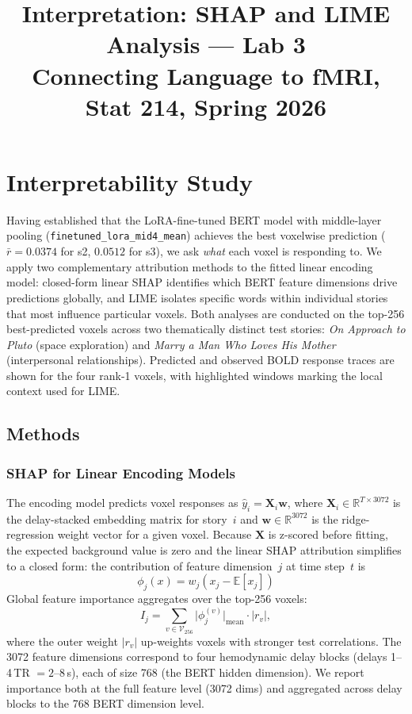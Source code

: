\documentclass[letterpaper,11pt]{article}
\title{Interpretation: SHAP and LIME Analysis --- Lab 3\\
       \large Connecting Language to fMRI, Stat 214, Spring 2026\vspace{-1em}}
\date{}
\begin{document}
\maketitle


\section{Interpretability Study}


Having established that the LoRA-fine-tuned BERT model with middle-layer pooling
(\texttt{finetuned\_lora\_mid4\_mean}) achieves the best voxelwise prediction
($\bar{r} = 0.0374$ for s2, $0.0512$ for s3), we ask \emph{what} each voxel is
responding to.  We apply two complementary attribution methods to the fitted
linear encoding model: closed-form linear SHAP identifies which BERT feature
dimensions drive predictions globally, and LIME isolates specific words within
individual stories that most influence particular voxels.  Both analyses are
conducted on the top-256 best-predicted voxels across two thematically distinct
test stories: \textit{On Approach to Pluto} (space exploration) and
\textit{Marry a Man Who Loves His Mother} (interpersonal relationships).
Predicted and observed BOLD response traces are shown for the four rank-1
voxels, with highlighted windows marking the local context used for LIME.


\subsection{Methods}


\subsubsection{SHAP for Linear Encoding Models}

The encoding model predicts voxel responses as $\hat{y}_i = \bm{X}_i \bm{w}$,
where $\bm{X}_i \in \mathbb{R}^{T \times 3072}$ is the delay-stacked embedding
matrix for story~$i$ and $\bm{w} \in \mathbb{R}^{3072}$ is the ridge-regression
weight vector for a given voxel.  Because $\bm{X}$ is z-scored before fitting,
the expected background value is zero and the linear SHAP attribution simplifies
to a closed form: the contribution of feature dimension~$j$ at time step~$t$ is
\begin{equation}
  \phi_j(x) = w_j (x_j - \mathbb{E}[x_j])
  \label{eq:shap}
\end{equation}
Global feature importance aggregates over the top-256 voxels:
\begin{equation}
  I_j = \sum_{v \in \mathcal{V}_{256}}
        \bigl|\phi_j^{(v)}\bigr|_{\text{mean}} \cdot \bigl|r_v\bigr|,
\end{equation}
where the outer weight $|r_v|$ up-weights voxels with stronger test correlations.
The 3072 feature dimensions correspond to four hemodynamic delay blocks
(delays 1--4\,TR $= 2$--8\,s), each of size 768 (the BERT hidden dimension).
We report importance both at the full feature level (3072 dims) and aggregated
across delay blocks to the 768 BERT dimension level.
\end{document}
